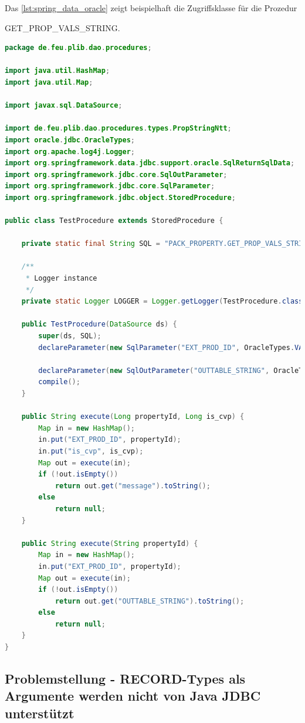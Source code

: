 Das \autoref{lst:spring_data_oracle} zeigt beispielhaft die Zugriffsklasse für die Prozedur 

GET\_PROP\_VALS\_STRING.

\begin{lstlisting}[caption=Spring Data Oracle - Aufruf der Prozeduren mit Rückgabetabellen, language=java, label=lst:spring_data_oracle]
package de.feu.plib.dao.procedures;

import java.util.HashMap;
import java.util.Map;

import javax.sql.DataSource;

import de.feu.plib.dao.procedures.types.PropStringNtt;
import oracle.jdbc.OracleTypes;
import org.apache.log4j.Logger;
import org.springframework.data.jdbc.support.oracle.SqlReturnSqlData;
import org.springframework.jdbc.core.SqlOutParameter;
import org.springframework.jdbc.core.SqlParameter;
import org.springframework.jdbc.object.StoredProcedure;

public class TestProcedure extends StoredProcedure {

    private static final String SQL = "PACK_PROPERTY.GET_PROP_VALS_STRING";

    /**
     * Logger instance
     */
    private static Logger LOGGER = Logger.getLogger(TestProcedure.class);

	public TestProcedure(DataSource ds) {
		super(ds, SQL);
		declareParameter(new SqlParameter("EXT_PROD_ID", OracleTypes.VARCHAR));

		declareParameter(new SqlOutParameter("OUTTABLE_STRING", OracleTypes.STRUCT, "PACK_PROPERTY.PROP_STRING_NTT", new SqlReturnSqlData(PropStringNtt.class)));
		compile();
	}

	public String execute(Long propertyId, Long is_cvp) {
		Map in = new HashMap();
		in.put("EXT_PROD_ID", propertyId);
        in.put("is_cvp", is_cvp);
		Map out = execute(in);
		if (!out.isEmpty())
			return out.get("message").toString();
		else
			return null;
	}

    public String execute(String propertyId) {
		Map in = new HashMap();
		in.put("EXT_PROD_ID", propertyId);
		Map out = execute(in);
		if (!out.isEmpty())
			return out.get("OUTTABLE_STRING").toString();
		else
			return null;
	}
}
\end{lstlisting}

\subsection{Problemstellung - RECORD-Types als Argumente werden nicht von Java JDBC unterstützt}

